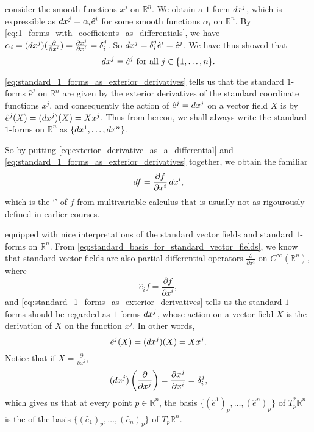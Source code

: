 \documentclass[notoc,notitlepage]{tufte-book}
\begin{document}
 consider the smooth functions $x^j$ on $\mathbb{R}^n$. We obtain a $1$-form
$\mathop{}\!d{x^j}$, which is expressible as $\mathop{}\!d{x^j} = \alpha_i \hat{e}^i$ for some smooth functions
$\alpha_i$ on $\mathbb{R}^n$. By \cref{eq:1_forms_with_coefficients_as_differentials}, we have
$\alpha_i = (\mathop{}\!d{x}^j)(\frac{\partial}{\partial x^i}) = \frac{\partial x^j}{\partial x^i} =
\delta_i^j$. So $\mathop{}\!d{x^j} = \delta_i^j \hat{e}^i = \hat{e}^j$. We have thus showed that
\begin{equation}\label{eq:standard_1_forms_as_exterior_derivatives}
  \mathop{}\!d{x^j} = \hat{e}^j \text{ for all } j \in \{ 1, \ldots, n \}.
\end{equation}

\cref{eq:standard_1_forms_as_exterior_derivatives} tells us that the standard $1$-forms $\hat{e}^j$
on $\mathbb{R}^n$ are given by the exterior derivatives of the standard coordinate functions $x^j$,
and consequently the action of $\hat{e}^j = \mathop{}\!d{x^j}$ on a vector field $X$ is by $\hat{e}^j(X)
= (\mathop{}\!d{x^j})(X) = X x^j$. Thus from hereon, we shall always write the standard $1$-forms on
$\mathbb{R}^n$ as $\{ \mathop{}\!d{x^1}, \ldots, \mathop{}\!d{x^n} \}$.

So by putting \cref{eq:exterior_derivative_as_a_differential} and
\cref{eq:standard_1_forms_as_exterior_derivatives} together, we obtain the familiar
\begin{equation}\label{eq:differential_of_f_from_multivar_calc}
  \mathop{}\!d{f} = \frac{\partial f}{\partial x^i} \mathop{}\!d{x^i},
\end{equation}
which is the `' of $f$ from multivariable calculus that is usually not
as rigourously defined in earlier courses.

 equipped with nice interpretations of the standard vector fields
and standard $1$-forms on $\mathbb{R}^n$. From \cref{eq:standard_basis_for_standard_vector_fields},
we know that standard vector fields are also partial differential operators 
$\frac{\partial}{\partial x^i}$ on $C^\infty(\mathbb{R}^n)$, where
\begin{equation*}
  \hat{e}_i f = \frac{\partial f}{\partial x^i},
\end{equation*}
and \cref{eq:standard_1_forms_as_exterior_derivatives} tells us the standard $1$-forms should be
regarded as $1$-forms $\mathop{}\!d{x^j}$, whose action on a vector field $X$ is the derivation of $X$
on the function $x^j$. In other words,
\begin{equation*}
  \hat{e}^j(X) = (\mathop{}\!d{x^j})(X) = X x^j.
\end{equation*}
Notice that if $X = \frac{\partial}{\partial x^i}$,
\begin{equation*}
  (\mathop{}\!d{x^j})\left( \frac{\partial}{\partial x^j} \right) = \frac{\partial x^j}{\partial x^i}
    = \delta_i^j,
\end{equation*}
which gives us that at every point $p \in \mathbb{R}^n$, the basis $\{ (\hat{e}^1)_p, \ldots,
  (\hat{e}^n)_p \}$ of $T_p^* \mathbb{R}^n$ is the  of the basis $\{
(\hat{e}_1)_p, \ldots, (\hat{e}_n)_p \}$ of $T_p \mathbb{R}^n$. 
\end{document}

